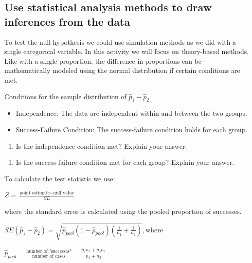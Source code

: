 \documentclass[
]{report}
\providecommand{\tightlist}{%
  \setlength{\itemsep}{0pt}\setlength{\parskip}{0pt}}
\begin{document}
\hypertarget{use-statistical-analysis-methods-to-draw-inferences-from-the-data}{%
\subsection{Use statistical analysis methods to draw inferences from the data}\label{use-statistical-analysis-methods-to-draw-inferences-from-the-data}}

To test the null hypothesis we could use simulation methods as we did with a single categorical variable. In this activity we will focus on theory-based methods. Like with a single proportion, the difference in proportions can be mathematically modeled using the normal distribution if certain conditions are met.

Conditions for the sample distribution of \(\hat{p}_1-\hat{p}_2\)

\begin{itemize}
\item
  Independence: The data are independent within and between the two groups.
\item
  Success-Failure Condition: The success-failure condition holds for each group.
\end{itemize}

\vspace{.25in}

\begin{enumerate}
\def\labelenumi{\arabic{enumi}.}
\setcounter{enumi}{15}
\tightlist
\item
  Is the independence condition met? Explain your answer.
\end{enumerate}

\vspace{1in}

\begin{enumerate}
\def\labelenumi{\arabic{enumi}.}
\setcounter{enumi}{16}
\tightlist
\item
  Is the success-failure condition met for each group? Explain your answer.
\end{enumerate}

\vspace{1in}
\newpage

To calculate the test statistic we use:

\begin{center}
    $Z = \frac{\text{point estimate} - \text{null value}}{SE}$

where the standard error is calculated using the pooled proportion of successes.

   $SE(\hat{p}_1-\hat{p}_2)=\sqrt{\hat{p}_{pool}(1-\hat{p}_{pool})(\frac{1}{n_1}+\frac{1}{n_2})}, \text{where}$ 
    
   $\hat{p}_{pool} = \frac{\text{number of "successes"}}{\text{number of cases}} = \frac{\hat{p}_1 n_1+\hat{p}_2 n_2}{n_1+n_2}$
    
\end{center}
\end{document}
